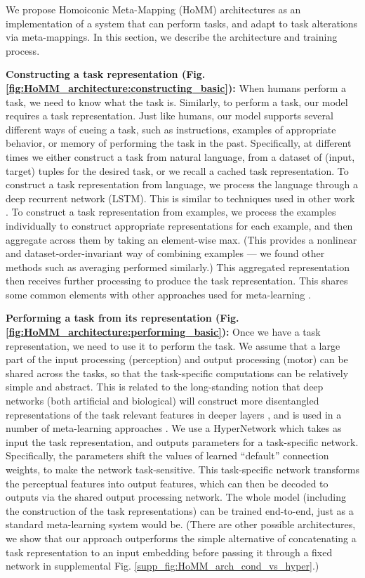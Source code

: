 We propose Homoiconic Meta-Mapping (HoMM) architectures as an implementation of a system that can perform tasks, and adapt to task alterations via meta-mappings. In this section, we describe the architecture and training process.

\textbf{Constructing a task representation (Fig. \ref{fig:HoMM_architecture:constructing_basic}):} When humans perform a task, we need to know what the task is. Similarly, to perform a task, our model requires a task representation. Just like humans, our model supports several different ways of cueing a task, such as instructions, examples of appropriate behavior, or memory of performing the task in the past. Specifically, at different times we either construct a task from natural language, from a dataset of (input, target) tuples for the desired task, or we recall a cached task representation. To construct a task representation from language, we process the language through a deep recurrent network (LSTM). This is similar to techniques used in other work \citep[e.g.]{Hermann2017,Oh2017a,Hill2019a}. To construct a task representation from examples, we process the examples individually to construct appropriate representations for each example, and then aggregate across them by taking an element-wise max. (This provides a nonlinear and dataset-order-invariant way of combining examples --- we found other methods such as averaging performed similarly.) This aggregated representation then receives further processing to produce the task representation. This shares some common elements with other approaches used for meta-learning \citep{Garnelo2018}. 

\textbf{Performing a task from its representation (Fig. \ref{fig:HoMM_architecture:performing_basic}):} Once we have a task representation, we need to use it to perform the task. We assume that a large part of the input processing (perception) and output processing (motor) can be shared across the tasks, so that the task-specific computations can be relatively simple and abstract. This is related to the long-standing notion that deep networks (both artificial and biological) will construct more disentangled representations of the task relevant features in deeper layers \citep{Dicarlo2007, Erhan2010}, and is used in a number of meta-learning approaches \citep[e.g.]{Vinyals2016}. We use a HyperNetwork \citep{Ha2016} which takes as input the task representation, and outputs parameters for a task-specific network. Specifically, the parameters shift the values of learned ``default'' connection weights, to make the network task-sensitive. This task-specific network transforms the perceptual features into output features, which can then be decoded to outputs via the shared output processing network. The whole model (including the construction of the task representations) can be trained end-to-end, just as a standard meta-learning system would be. (There are other possible architectures, we show that our approach outperforms the simple alternative of concatenating a task representation to an input embedding before passing it through a fixed network in supplemental Fig. \ref{supp_fig:HoMM_arch_cond_vs_hyper}.) 

